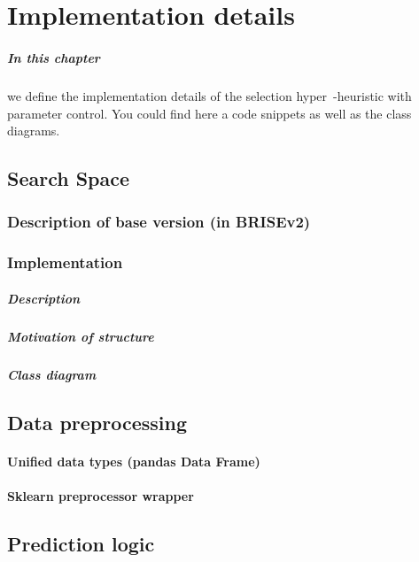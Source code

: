 \chapter{Implementation details}
\paragraph{In this chapter} we define the implementation details of the selection hyper~-heuristic with parameter control. You could find here a code snippets as well as the class diagrams.


\section{Search Space}

\subsection{Description of base version (in BRISEv2)}

\subsection{Implementation}
\paragraph{Description}
\paragraph{Motivation of structure}
\paragraph{Class diagram}


\section{Data preprocessing}
\subsubsection{Unified data types (pandas Data Frame)}
\subsubsection{Sklearn preprocessor wrapper}


\section{Prediction logic}

